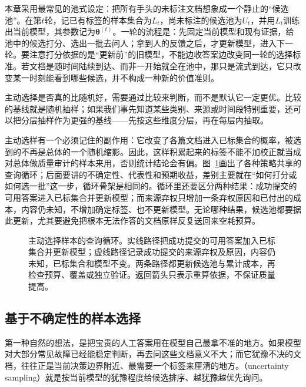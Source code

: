 本章采用最常见的池式设定：把所有手头的未标注文档想象成一个静止的“候选池”。在第$t$轮，记已有标签的样本集合为$L_t$，尚未标注的候选池为$U_t$，并用$L_t$训练出当前模型，其参数记为$\bm{\theta}^{(t)}$。一轮的流程是：先固定当前模型和现有证据，给池中的候选打分、选出一批去问人；拿到人的反馈之后，才更新模型，进入下一轮。要注意打分依据的是“更新前”的旧模型，不能边收答案边改变同一轮的选择标准。若文档是随时间陆续到达、而非一开始就全在池中，那只是流式到达，它只改变某一时刻能看到哪些候选，并不构成一种新的价值准则。

主动选择是否真的比随机好，需要通过比较来判断，而不是默认它一定更优。比较的基线就是随机抽样；如果我们事先知道某些类别、来源或时间段特别重要，还可以把分层抽样作为更强的基线——先按这些维度分层，再在每层内抽取。

主动选样有一个必须记住的副作用：它改变了各篇文档进入已标集合的概率，被选到的不再是总体的一个随机缩影。因此，这样积累起来的标签不能不加校正就当成对总体做质量审计的样本来用，否则统计结论会有偏。图~\ref{fig:knowledge-acquisition-human-query-loop}画出了各种策略共享的查询循环；后面要讲的不确定性、代表性和预期收益，差别主要就在“如何打分或如何选一批”这一步，循环骨架是相同的。循环里还要区分两种结果：成功提交的可用答案进入已标集合并更新模型；而来源弃权只增加一条弃权原因和已付出的成本，内容仍未知，不增加确定标签、也不更新模型。无论哪种结果，候选池都要据此更新，尤其要避免把根本无法作答的文档原样反复送回来空耗预算。

\begin{figure}[htbp]
  \centering
  
  \caption{主动选择样本的查询循环。实线路径把成功提交的可用答案加入已标集合并更新模型；虚线路径记录成功提交的来源弃权及原因，内容仍未知，已标集合和模型不变。两条路径都更新候选池与累计成本，再检查预算、覆盖或独立验证。返回箭头只表示重算依据，不保证质量提高。}
  \label{fig:knowledge-acquisition-human-query-loop}
\end{figure}

\subsection{基于不确定性的样本选择}
\label{sec:knowledge-acquisition-human-uncertainty-selection}

第一种自然的想法，是把宝贵的人工答案用在模型自己最拿不准的地方。如果模型对大部分常见故障已经能稳定判断，再去问这些文档意义不大；而它犹豫不决的文档，往往正是当前决策边界附近、最需要一个标签来厘清的地方。（uncertainty sampling）就是按当前模型的犹豫程度给候选排序、越犹豫越优先询问。

